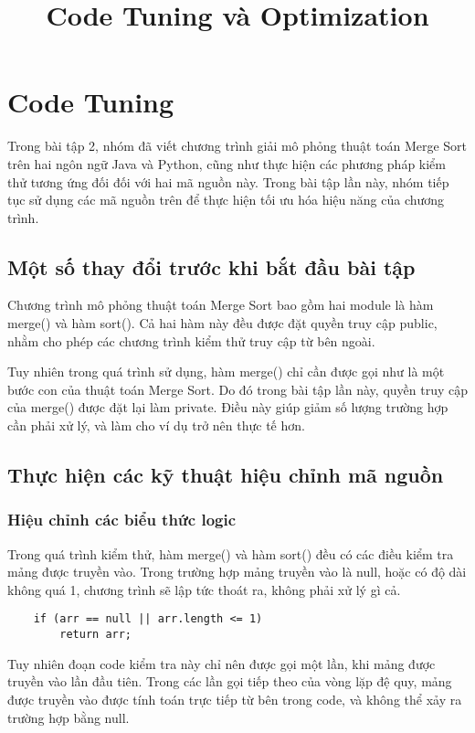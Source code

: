 \documentclass{article}
\title{Code Tuning và Optimization}
\begin{document}
    \section{Code Tuning}

    Trong bài tập 2, nhóm đã viết chương trình giải mô phỏng 
    thuật toán Merge Sort trên hai ngôn ngữ Java và Python,
    cũng như thực hiện các phương pháp kiểm thử tương ứng đối
    đối với hai mã nguồn này. Trong bài tập lần này, nhóm tiếp 
    tục sử dụng các mã nguồn trên để thực hiện tối ưu hóa hiệu
    năng của chương trình.

    \subsection{Một số thay đổi trước khi bắt đầu bài tập}

    Chương trình mô phỏng thuật toán Merge Sort bao gồm hai
    module là hàm merge() và hàm sort(). Cả hai hàm này đều được
    đặt quyền truy cập public, nhằm cho phép các chương trình 
    kiểm thử truy cập từ bên ngoài. 
    
    Tuy nhiên trong quá trình sử dụng, hàm merge() chỉ cần được 
    gọi như là một bước con của thuật toán Merge Sort. Do đó 
    trong bài tập lần này, quyền truy cập của merge() được đặt lại
    làm private. Điều này giúp giảm số lượng trường hợp cần phải
    xử lý, và làm cho ví dụ trở nên thực tế hơn.

    \subsection{Thực hiện các kỹ thuật hiệu chỉnh mã nguồn}
    
    \subsubsection{Hiệu chỉnh các biểu thức logic}
    Trong quá trình kiểm thử, hàm merge() và hàm sort() đều có các điều
    kiểm tra mảng được truyền vào. Trong trường hợp mảng truyền vào là null,
    hoặc có độ dài không quá 1, chương trình sẽ lập tức thoát ra, không phải
    xử lý gì cả.

    \begin{lstlisting}
    if (arr == null || arr.length <= 1)
        return arr;
    \end{lstlisting}

    Tuy nhiên đoạn code kiểm tra này chỉ nên được gọi một lần, khi mảng 
    được truyền vào lần đầu tiên. Trong các lần gọi tiếp theo của vòng lặp
    đệ quy, mảng được truyền vào được tính toán trực tiếp từ bên trong code,
    và không thể xảy ra trường hợp bằng null. 
\end{document}
